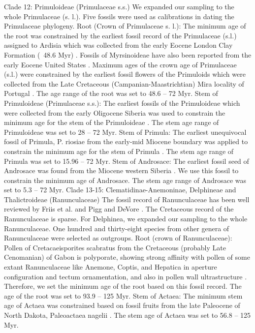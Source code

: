 \documentclass[10pt]{article}
\begin{document}
Clade 12: Primuloideae (Primulaceae s.s.)
We expanded our sampling to the whole Primulaceae (s. l.). Five fossils were used as calibrations in dating the Primulaceae phylogeny. 
Root (Crown of Primulaceae s. l.): The minimum age of the root was constrained by the earliest fossil record of the Primulaceae (s.l.) assigned to Ardisia which was collected from the early Eocene London Clay Formation (~48.6 Myr) \citep{Collinson 1984}. Fossils of Myrsinoideae have also been reported from the early Eocene United States \citep{Irving and Stuessy 1971}. Maximum ages of the crown age of Primulaceae (s.l.) were constrained by the earliest fossil flowers of the Primuloids which were collected from the Late Cretaceous (Campanian-Maastrichtian) Mira locality of Portugal \citep{Friis, Crane et al. 2011}. The age range of the root was set to 48.6 – 72 Myr.
Stem of Primuloideae (Primulaceae s.s.): The earliest fossils of the Primuloideae which were collected from the early Oligocene Siberia was used to constrain the minimum age for the stem of the Primuloideae \citep{Nikitin 2006}. The stem age range of Primuloideae was set to 28 – 72 Myr.
Stem of Primula: The earliest unequivocal fossil of Primula, P. riosiae from the early-mid Miocene boundary was applied to constrain the minimum age for the stem of Primula \citep{de Vos, Hughes et al. 2014}. The stem age range of Primula was set to 15.96 – 72 Myr.
Stem of Androsace: The earliest fossil seed of Androsace was found from the Miocene western Siberia \citep{Dorofeev 1963}. We use this fossil to constrain the minimum age of Androsace. The stem age range of Androsace was set to 5.3 – 72 Myr.
Clade 13-15: Clematidinae-Anemoninae, Delphineae and Thalictroideae (Ranunculaceae)
The fossil record of Ranunculaceae has been well reviewed by Friis et al. \citep{Friis, Crane et al. 2011} and Pigg and DeVore \citep{Pigg and DeVore 2005}. The Cretaceous record of the Ranunculaceae is sparse. For Delphinea, we expanded our sampling to the whole Ranunculaceae. One hundred and thirty-eight species from other genera of Ranunculaceae were selected as outgroups. 
Root (crown of Ranunculaceae): Pollen of Cretacaeisporites scabratus from the Cretaceous (probably Late Cenomanian) of Gabon is polyporate, showing strong affinity with pollen of some extant Ranunculaceae like Anemone, Coptis, and Hepatica in aperture configuration and tectum ornamentation, and also in pollen wall ultrastructure \citep{Ward and Doyle 1994}. Therefore, we set the minimum age of the root based on this fossil record. The age of the root was set to 93.9 – 125 Myr.
Stem of Actaea: The minimum stem age of Actaea was constrained based on fossil fruits from the late Paleocene of North Dakota, Paleoactaea nagelii \citep{Pigg and DeVore 2005}. The stem age of Actaea was set to 56.8 – 125 Myr.
\end{document}
